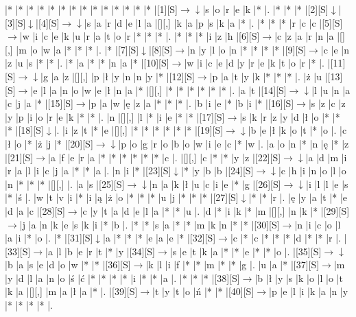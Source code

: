\documentclass[11pt]{article}
\newcommand\drarr{$\rightarrow \!\!\!\!\! \downarrow$}
\newcommand\rarr{$\rightarrow$}
\newcommand\darr{$\downarrow$}
\begin{document}
\noindent\begin{Puzzle}{20}{26}|*	|*	|*	|*	|*	|*	|*	|*	|*	|*	|*	|*	|*	|*	|[1][S]\drarr	|s	|o	|r	|e	|k	|*	|.
|*	|*	|*	|[2][S]\darr	|[3][S]\darr	|[4][S]\drarr	|s	|a	|r	|d	|e	|l	|a	|[][,]{ }	|k	|a	|p	|s	|k	|a	|*	|.
|*	|*	|*	|r	|c	|c	|[5][S]\rarr	|w	|i	|c	|e	|k	|u	|r	|a	|t	|o	|r	|*	|*	|*	|.
|*	|*	|*	|i	|z	|h	|[6][S]\rarr	|c	|z	|a	|r	|n	|a	|[][,]{ }	|m	|o	|w	|a	|*	|*	|*	|.
|*	|[7][S]\darr	|[8][S]\rarr	|n	|y	|l	|o	|n	|*	|*	|*	|*	|[9][S]\rarr	|c	|e	|n	|z	|u	|s	|*	|*	|.
|*	|a	|*	|*	|n	|a	|*	|[10][S]\rarr	|w	|i	|c	|e	|d	|y	|r	|e	|k	|t	|o	|r	|*	|.
|[11][S]\drarr	|g	|a	|z	|[][,]{ }	|p	|ł	|y	|n	|n	|y	|*	|[12][S]\rarr	|p	|a	|t	|y	|k	|*	|*	|*	|.
|ż	|u	|[13][S]\rarr	|e	|l	|a	|n	|o	|w	|e	|ł	|n	|a	|*	|[][,]{ }	|*	|*	|*	|*	|*	|*	|.
|a	|t	|[14][S]\drarr	|l	|u	|n	|a	|c	|j	|a	|*	|[15][S]\rarr	|p	|a	|w	|ę	|z	|a	|*	|*	|*	|.
|b	|i	|e	|*	|b	|i	|*	|[16][S]\rarr	|s	|z	|c	|z	|y	|p	|i	|o	|r	|e	|k	|*	|*	|.
|n	|[][,]{ }	|l	|*	|i	|e	|*	|*	|[17][S]\rarr	|s	|k	|r	|z	|y	|d	|ł	|o	|*	|*	|*	|[18][S]\darr	|.
|i	|z	|t	|*	|e	|[][,]{ }	|*	|*	|*	|*	|*	|*	|[19][S]\drarr	|b	|e	|ł	|k	|o	|t	|*	|o	|.
|c	|ł	|o	|*	|ż	|j	|*	|[20][S]\drarr	|p	|o	|g	|r	|o	|b	|o	|w	|i	|e	|c	|*	|w	|.
|a	|o	|n	|*	|n	|ę	|*	|z	|[21][S]\rarr	|a	|f	|e	|r	|a	|*	|*	|*	|*	|*	|*	|c	|.
|[][,]{ }	|c	|*	|*	|y	|z	|[22][S]\drarr	|a	|d	|m	|i	|r	|a	|l	|i	|c	|j	|a	|*	|*	|a	|.
|n	|i	|*	|[23][S]\darr	|*	|y	|b	|b	|[24][S]\drarr	|c	|h	|i	|n	|o	|l	|o	|n	|*	|*	|*	|[][,]{ }	|.
|a	|s	|[25][S]\drarr	|n	|a	|k	|ł	|u	|c	|i	|e	|*	|g	|[26][S]\drarr	|i	|l	|l	|e	|s	|*	|ś	|.
|w	|t	|v	|i	|*	|i	|ą	|ż	|o	|*	|*	|*	|u	|j	|*	|*	|*	|[27][S]\darr	|*	|*	|r	|.
|ę	|y	|a	|t	|*	|e	|d	|a	|c	|[28][S]\rarr	|c	|y	|t	|a	|d	|e	|l	|a	|*	|*	|u	|.
|d	|*	|i	|k	|*	|m	|[][,]{ }	|n	|k	|*	|[29][S]\rarr	|j	|a	|n	|k	|e	|s	|k	|i	|*	|b	|.
|*	|*	|s	|a	|*	|*	|m	|k	|n	|*	|*	|[30][S]\rarr	|n	|i	|c	|o	|l	|a	|i	|*	|o	|.
|*	|[31][S]\darr	|a	|*	|*	|*	|e	|a	|e	|*	|[32][S]\rarr	|c	|*	|c	|*	|*	|*	|d	|*	|*	|r	|.
|[33][S]\rarr	|a	|l	|b	|e	|r	|t	|*	|y	|[34][S]\rarr	|s	|e	|t	|k	|a	|*	|*	|e	|*	|*	|o	|.
|[35][S]\drarr	|b	|a	|s	|e	|d	|o	|w	|*	|*	|[36][S]\rarr	|k	|l	|i	|f	|*	|*	|m	|*	|*	|g	|.
|u	|a	|*	|[37][S]\rarr	|m	|y	|d	|l	|a	|n	|o	|ś	|ć	|*	|*	|*	|*	|i	|*	|*	|a	|.
|*	|*	|*	|[38][S]\rarr	|b	|ł	|y	|s	|k	|o	|l	|o	|t	|k	|a	|[][,]{ }	|m	|a	|ł	|a	|*	|.
|[39][S]\rarr	|t	|y	|t	|o	|ń	|*	|*	|[40][S]\rarr	|p	|e	|l	|i	|k	|a	|n	|y	|*	|*	|*	|*	|.\end{Puzzle}

\newpage
\end{document}
